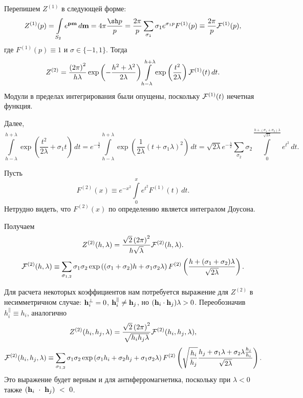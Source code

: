 \documentclass[12pt]{article}
\def\m{\mathbf m{}}
\def\p{\mathbf p{}}
\def\h{{\bf h}}
\def\ZS{Z^{(1)}}
\def\ZV{Z^{(2)}}
\def\FS{F^{(1)}}
\def\FV{F^{(2)}}
\def\cFS{{\cal F}^{(1)}}
\def\cFV{{\cal F}^{(2)}}
\def\IS{\int\limits_{S_2}}
\begin{document}
Перепишем $\ZS$ в следующей форме:
\begin{equation}
  \ZS (p) = \IS e^{\p\m}\,d\m = 4\pi\frac{\sh p}{p} =  \frac{2\pi}{p} \sum\limits_{\sigma_1} \sigma_1e^{\sigma_1p} \FS(p) \equiv \frac{2\pi}{p} \cFS(p),
\end{equation}
где $\FS(p) \equiv 1$ и $\sigma \in \{-1, 1\}$. Тогда
\begin{equation}
  \ZV = \frac{\left(2\pi\right)^2}{h\lambda} \exp\left(-\frac{h^2+\lambda^2}{2\lambda}\right) \int\limits_{h-\lambda}^{h+\lambda} \exp\left({\frac{t^2}{2\lambda}}\right)\cFS(t)\,dt.
\end{equation}
Модули в пределах интегрирования были опущены, поскольку $\cFS(t)$ нечетная функция.

Далее, 
\begin{equation}
  \int\limits_{h-\lambda}^{h+\lambda} \exp\left({\frac{t^2}{2\lambda}}+\sigma_1t\right)\,dt
  =
  e^{-\frac{\lambda}{2}}\int\limits_{h-\lambda}^{h+\lambda} \exp\left(\frac{1}{2\lambda} \left(t+\sigma_1\lambda\right)^2\right)\,dt
  =
  \sqrt{2\lambda}e^{-\frac{\lambda}{2}}\sum\limits_{\sigma_2} \sigma_2 \int\limits_{0}^{\frac{h+(\sigma_1+\sigma_2)\lambda}{\sqrt{2\lambda}}} e^{t^2}\,dt.
\end{equation}

Пусть
\begin{equation}
  \FV(x) \equiv e^{-x^2}\int\limits_0^xe^{t^2}\FS(t)\,dt.
\end{equation}
Нетрудно видеть, что $\FV(x)$ по определению является интегралом Доусона.

Получаем
\begin{equation}
    \ZV (h, \lambda) = \frac{\sqrt{2}\left(2\pi\right)^2}{h\sqrt{\lambda}}  \cFV(h, \lambda).
\end{equation}
\begin{equation}
    \cFV(h, \lambda) \equiv \sum\limits_{\sigma_{1,2}} \sigma_1\sigma_2\exp\left({(\sigma_1+\sigma_2)h+\sigma_1\sigma_2\lambda}\right)\FV\left(\frac{h+(\sigma_1+\sigma_2)\lambda}{\sqrt{2\lambda}}\right).
\end{equation}

Для расчета некоторых коэффициентов нам потребуется выражение для $\ZV$ в несимметричном случае: $\h_i^\perp = 0$, $\h_i^\parallel \neq \h_j$, но $(\h_i \cdot \h_j) \lambda > 0$. Переобозначив $h_i^\parallel \equiv h_i$, аналогично
\begin{equation}\label{Z2::nonsym}
    \ZV (h_i, h_j, \lambda) = \frac{\sqrt{2}\left(2\pi\right)^2}{\sqrt{h_ih_j\lambda}} \cFV(h_i, h_j, \lambda),
\end{equation}
\begin{equation}
    \cFV(h_i, h_j, \lambda) \equiv \sum\limits_{\sigma_{1,2}} \sigma_1\sigma_2\exp\left({\sigma_1h_i+\sigma_2h_j+\sigma_1\sigma_2\lambda}\right)\FV\left(\sqrt{\frac{h_i}{h_j}}\frac{h_j+\sigma_1\lambda+\sigma_2\lambda\frac{h_j}{h_i}}{\sqrt{2\lambda}}\right).
\end{equation}
Это выражение будет верным и для антиферромагнетика, поскольку при $\lambda < 0$ также $(\h_i~\cdot~\h_j)~<~0$.
\end{document}
